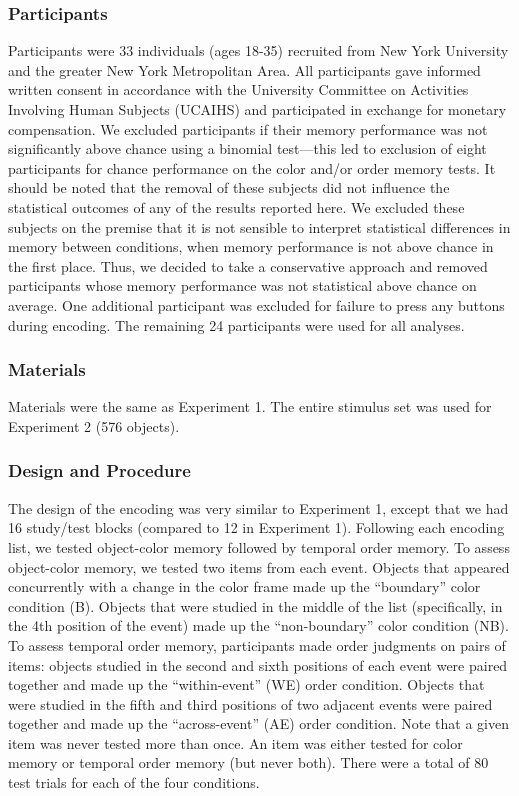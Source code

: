 \subsubsection{Participants}\label{participants-1}

Participants were 33 individuals (ages 18-35) recruited from New York
University and the greater New York Metropolitan Area. All participants
gave informed written consent in accordance with the University
Committee on Activities Involving Human Subjects (UCAIHS) and
participated in exchange for monetary compensation. We excluded
participants if their memory performance was not significantly above
chance using a binomial test---this led to exclusion of eight
participants for chance performance on the color and/or order memory
tests. It should be noted that the removal of these subjects did not
influence the statistical outcomes of any of the results reported here.
We excluded these subjects on the premise that it is not sensible to
interpret statistical differences in memory between conditions, when
memory performance is not above chance in the first place. Thus, we
decided to take a conservative approach and removed participants whose
memory performance was not statistical above chance on average. One
additional participant was excluded for failure to press any buttons
during encoding. The remaining 24 participants were used for all
analyses.

\subsubsection{Materials}\label{materials-1}

Materials were the same as Experiment 1. The entire stimulus set was
used for Experiment 2 (576 objects).

\subsubsection{Design and Procedure}\label{design-and-procedure-1}

The design of the encoding was very similar to Experiment 1, except that
we had 16 study/test blocks (compared to 12 in Experiment 1). Following
each encoding list, we tested object-color memory followed by temporal
order memory. To assess object-color memory, we tested two items from
each event. Objects that appeared concurrently with a change in the
color frame made up the ``boundary'' color condition (B). Objects that
were studied in the middle of the list (specifically, in the 4th
position of the event) made up the ``non-boundary'' color condition
(NB). To assess temporal order memory, participants made order judgments
on pairs of items: objects studied in the second and sixth positions of
each event were paired together and made up the ``within-event'' (WE)
order condition. Objects that were studied in the fifth and third
positions of two adjacent events were paired together and made up the
``across-event'' (AE) order condition. Note that a given item was never
tested more than once. An item was either tested for color memory or
temporal order memory (but never both). There were a total of 80 test
trials for each of the four conditions.

